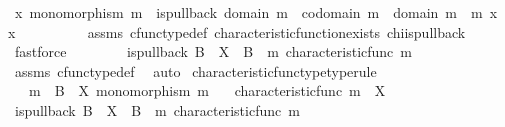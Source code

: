 \begin{isabellebody}
\ {\isachardoublequoteopen}{\isasymAnd}x{\isachardot}{\kern0pt}\ monomorphism\ m\ {\isasymlongrightarrow}\ is{\isacharunderscore}{\kern0pt}pullback\ {\isacharparenleft}{\kern0pt}domain\ m{\isacharparenright}{\kern0pt}\ {\isasymone}\ {\isacharparenleft}{\kern0pt}codomain\ m{\isacharparenright}{\kern0pt}\ {\isasymOmega}\ {\isacharparenleft}{\kern0pt}{\isasymbeta}\isactrlbsub domain\ m\isactrlesub {\isacharparenright}{\kern0pt}\ {\isasymt}\ m\ x\ {\isasymLongrightarrow}\ x\ {\isacharequal}{\kern0pt}\ {\isasymchi}{\isachardoublequoteclose}\isanewline
\ \ \ \ \ \ \isamarkupfalse%
\ assms\ cfunc{\isacharunderscore}{\kern0pt}type{\isacharunderscore}{\kern0pt}def\ characteristic{\isacharunderscore}{\kern0pt}function{\isacharunderscore}{\kern0pt}exists\ chi{\isacharunderscore}{\kern0pt}is{\isacharunderscore}{\kern0pt}pullback\ \isamarkupfalse%
\ fastforce\isanewline
\ \ \isamarkupfalse%
\isanewline
\ \ \isamarkupfalse%
\ \isamarkupfalse%
\ {\isachardoublequoteopen}is{\isacharunderscore}{\kern0pt}pullback\ B\ {\isasymone}\ X\ {\isasymOmega}\ {\isacharparenleft}{\kern0pt}{\isasymbeta}\isactrlbsub B\isactrlesub {\isacharparenright}{\kern0pt}\ {\isasymt}\ m\ {\isacharparenleft}{\kern0pt}characteristic{\isacharunderscore}{\kern0pt}func\ m{\isacharparenright}{\kern0pt}{\isachardoublequoteclose}\isanewline
\ \ \ \ \isamarkupfalse%
\ assms\ cfunc{\isacharunderscore}{\kern0pt}type{\isacharunderscore}{\kern0pt}def\ \isamarkupfalse%
\ auto\isanewline
{}\isamarkupfalse%
%
\endisatagproof
{\isafoldproof}%
%
\isadelimproof
\isanewline
%
\endisadelimproof
\isanewline
{}\isamarkupfalse%
\ characteristic{\isacharunderscore}{\kern0pt}func{\isacharunderscore}{\kern0pt}type{\isacharbrackleft}{\kern0pt}type{\isacharunderscore}{\kern0pt}rule{\isacharbrackright}{\kern0pt}{\isacharcolon}{\kern0pt}\isanewline
\ \ \ {\isachardoublequoteopen}m\ {\isacharcolon}{\kern0pt}\ B\ {\isasymrightarrow}\ X{\isachardoublequoteclose}\ {\isachardoublequoteopen}monomorphism\ m{\isachardoublequoteclose}\isanewline
\ \ \ {\isachardoublequoteopen}characteristic{\isacharunderscore}{\kern0pt}func\ m\ {\isacharcolon}{\kern0pt}\ X\ {\isasymrightarrow}\ {\isasymOmega}{\isachardoublequoteclose}\isanewline
%
\isadelimproof
%
\endisadelimproof
%
\isatagproof
{}\isamarkupfalse%
\ {\isacharminus}{\kern0pt}\isanewline
\ \ \isamarkupfalse%
\ {\isachardoublequoteopen}is{\isacharunderscore}{\kern0pt}pullback\ B\ {\isasymone}\ X\ {\isasymOmega}\ {\isacharparenleft}{\kern0pt}{\isasymbeta}\isactrlbsub B\isactrlesub {\isacharparenright}{\kern0pt}\ {\isasymt}\ m\ {\isacharparenleft}{\kern0pt}characteristic{\isacharunderscore}{\kern0pt}func\ m{\isacharparenright}{\kern0pt}{\isachardoublequoteclose}\isanewline

\end{isabellebody}
